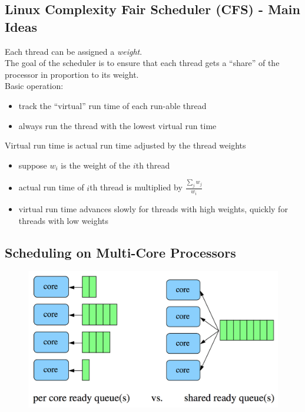 \documentclass[12pt]{article}
\theoremstyle{plain}
\theoremstyle{definition}
\begin{document}
\subsection{Linux Complexity Fair Scheduler (CFS) - Main Ideas}
Each thread can be assigned a \emph{weight}. \\
The goal of the scheduler is to ensure that each thread gets a ``share'' of the processor in proportion to its weight. \\

Basic operation:
\begin{itemize}
  \item track the ``virtual'' run time of each run-able thread
  \item always run the thread with the lowest virtual run time
\end{itemize}

Virtual run time is actual run time adjusted by the thread weights
\begin{itemize}
  \item suppose $w_{i}$ is the weight of the $i$th thread
  \item actual run time of $i$th thread is multiplied by $\frac{\sum_{j}w_{j}}{w_{i}}$
  \item virtual run time advances slowly for threads with high weights, quickly for threads with low weights
\end{itemize}

\subsection{Scheduling on Multi-Core Processors}
\begin{figure}[H]
  \centering
  \includegraphics[scale=0.5]{pictures/multicore_scheduling.png}
\end{figure}
\end{document}
